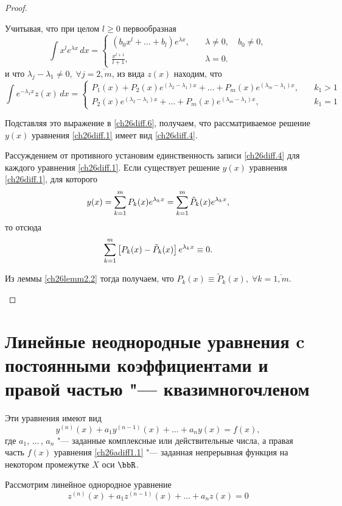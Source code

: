 \begin{proof}
\begin{enumerate}[wide, labelwidth=!, labelindent=0pt]
Учитывая, что при целом $l\ge 0$ первообразная
$$
\int x^le^{\lambda x}\,dx = \begin{cases}
(b_0x^l+\dots+b_l)e^{\lambda x},\quad &\lambda \neq 0,\quad  b_0\neq 0,\\
\frac{x^{l+1}}{l+1},\quad &\lambda=0.
\end{cases}
$$
и что $\lambda_j-\lambda_1\neq 0,\; \forall j=\overline{2,m}$, из вида $z(x)$ находим, что
$$
\int e^{-\lambda_1x}z(x)\,dx = \begin{cases}
P_1(x)+P_2(x)e^{(\lambda_2-\lambda_1)x}+\dots+P_m(x)e^{(\lambda_m-\lambda_1)x},\quad &k_1>1\\
P_2(x)e^{(\lambda_2-\lambda_1)x}+\dots+P_m(x)e^{(\lambda_m-\lambda_1)x},\quad &k_1=1
\end{cases}
$$

Подставляя это выражение в \eqref{ch26diff.6}, получаем, что рассматриваемое решение $y(x)$ уравнения \eqref{ch26diff.1} имеет вид \eqref{ch26diff.4}.

Рассуждением от противного установим единственность записи \eqref{ch26diff.4} для каждого уравнения \eqref{ch26diff.1}. Если существует решение $y(x)$ уравнения \eqref{ch26diff.1}, для которого
$$
y(x)=\sum_{k=1}^{m}\limits P_k(x)e^{\lambda_kx}=\sum_{k=1}^{m}\limits \tilde{P}_k(x)e^{\lambda_kx},
$$
то отсюда
$$
\sum_{k=1}^{m}\limits\left[P_k(x)-\tilde{P}_k(x)\right]e^{\lambda_kx}\equiv 0.
$$

Из леммы \ref{ch26lemm2.2} тогда получаем, что $P_k(x)\equiv\tilde{P}_k(x),\; \forall k= \overline{1,m}$.
\end{enumerate}
\end{proof}

\section{Линейные неоднородные уравнения c постоянными коэффициентами и правой частью "--- квазимногочленом}
Эти уравнения имеют вид
\begin{equation} \label{ch26adiff1.1}
y^{(n)}(x)+a_1y^{(n-1)}(x)+\dots+a_ny(x)=f(x),
\end{equation}
где $a_1$, $\dots\,$, $a_n$ "--- заданные комплексные или действительные числа, а правая часть $f(x)$ уравнения \eqref{ch26adiff1.1} "--- заданная непрерывная функция на некотором промежутке $X$ оси $\bbR$.

Рассмотрим линейное однородное уравнение
\begin{equation}\label{ch26adiff1.2}
z^{(n)}(x)+a_1z^{(n-1)}(x)+\dots+a_nz(x)=0
\end{equation}

